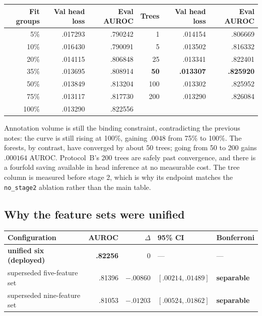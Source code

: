 \documentclass[10pt,a4paper]{article}
\newcommand{\fix}[1]{\textcolor{red!65!black}{#1}}
\begin{document}
\begin{center}\small
\begin{tabular}{rrr@{\qquad}rrr}
\toprule
Fit groups & Val head loss & Eval AUROC & Trees & Val head loss & Eval AUROC \\
\midrule
5\% & .017293 & .790242 & 1 & .014154 & .806669 \\
10\% & .016430 & .790091 & 5 & .013502 & .816332 \\
20\% & .014115 & .806848 & 25 & .013341 & .822401 \\
35\% & .013695 & .808914 & \textbf{50} & \textbf{.013307} & \textbf{.825920} \\
50\% & .013849 & .813204 & 100 & .013302 & .825952 \\
75\% & .013117 & .817730 & 200 & .013290 & .826084 \\
100\% & .013290 & .822556 & & & \\
\bottomrule
\end{tabular}
\end{center}

\fix{Annotation volume is still the binding constraint}, contradicting the previous notes: the
curve is still rising at 100\%, gaining $.0048$ from 75\% to 100\%. The forests, by contrast, have
converged by about 50 trees; going from 50 to 200 gains $.000164$ AUROC. Protocol~B's 200 trees
are safely past convergence, and there is a fourfold saving available in head inference at no
measurable cost. The tree column is measured before stage 2, which is why its endpoint matches the
\texttt{no\_stage2} ablation rather than the main table.

\subsection{Why the feature sets were unified}
\label{sec:unify}

\begin{center}\small
\begin{tabular}{lrrll}
\toprule
Configuration & AUROC & $\Delta$ & 95\% CI & Bonferroni \\
\midrule
\textbf{unified six (deployed)} & \textbf{.82256} & 0 & --- & --- \\
superseded five-feature set & .81396 & $-.00860$ & $[.00214,.01489]$ & \textbf{separable} \\
superseded nine-feature set & .81053 & $-.01203$ & $[.00524,.01862]$ & \textbf{separable} \\
\bottomrule
\end{tabular}
\end{center}
\end{document}
